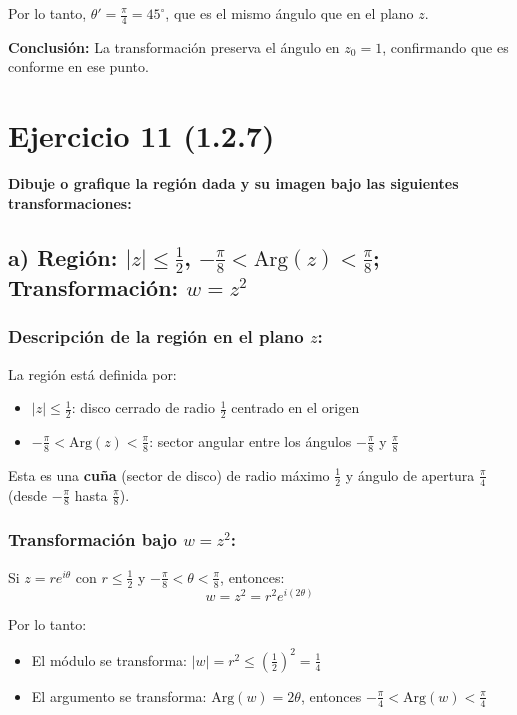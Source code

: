 \documentclass{article}
\begin{document}
Por lo tanto, $\theta' = \frac{\pi}{4} = 45^\circ$, que es el mismo ángulo que en el plano $z$.

\textbf{Conclusión:} La transformación preserva el ángulo en $z_0 = 1$, confirmando que es conforme en ese punto.

\newpage
\section*{Ejercicio 11 (1.2.7)}

\textbf{Dibuje o grafique la región dada y su imagen bajo las siguientes transformaciones:}

\subsection*{a) Región: $|z| \leq \frac{1}{2}$, $-\frac{\pi}{8} < \text{Arg}(z) < \frac{\pi}{8}$; Transformación: $w = z^2$}

\subsubsection*{Descripción de la región en el plano $z$:}

La región está definida por:
\begin{itemize}
\item $|z| \leq \frac{1}{2}$: disco cerrado de radio $\frac{1}{2}$ centrado en el origen
\item $-\frac{\pi}{8} < \text{Arg}(z) < \frac{\pi}{8}$: sector angular entre los ángulos $-\frac{\pi}{8}$ y $\frac{\pi}{8}$
\end{itemize}

Esta es una \textbf{cuña} (sector de disco) de radio máximo $\frac{1}{2}$ y ángulo de apertura $\frac{\pi}{4}$ (desde $-\frac{\pi}{8}$ hasta $\frac{\pi}{8}$).

\subsubsection*{Transformación bajo $w = z^2$:}

Si $z = re^{i\theta}$ con $r \leq \frac{1}{2}$ y $-\frac{\pi}{8} < \theta < \frac{\pi}{8}$, entonces:
$$w = z^2 = r^2 e^{i(2\theta)}$$

Por lo tanto:
\begin{itemize}
\item El módulo se transforma: $|w| = r^2 \leq \left(\frac{1}{2}\right)^2 = \frac{1}{4}$
\item El argumento se transforma: $\text{Arg}(w) = 2\theta$, entonces $-\frac{\pi}{4} < \text{Arg}(w) < \frac{\pi}{4}$
\end{itemize}
\end{document}
